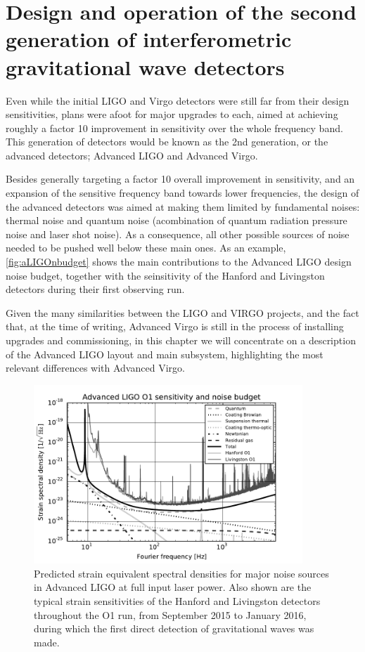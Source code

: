 \section{Design and operation of the second generation of interferometric gravitational wave detectors}\label{subsec:2ndgen}
Even while the initial LIGO and Virgo detectors were still far from their design sensitivities, plans were afoot for major upgrades to each, aimed at achieving roughly a factor 10 improvement in sensitivity over the whole frequency band. 
This generation of detectors would be known as the 2nd generation, or the advanced detectors; Advanced LIGO and Advanced Virgo. 

Besides generally targeting a factor 10 overall improvement in sensitivity, and an expansion of the sensitive frequency band towards lower frequencies, the design of the advanced detectors was aimed at making them limited by fundamental noises: thermal noise and quantum noise (acombination of quantum radiation pressure noise and laser shot noise).
As a consequence, all other possible sources of noise needed to be pushed well below these main ones.
As an example, \autoref{fig:aLIGOnbudget} shows the main contributions to the Advanced LIGO design noise budget, together with the seinsitivity of the Hanford and Livingston detectors during their first observing run.

Given the many similarities between the LIGO and VIRGO projects, and the fact that, at the time of writing, Advanced Virgo is still in the process of installing upgrades and commissioning, in this chapter we will concentrate on a description of the Advanced LIGO layout and main subsystem, highlighting the most relevant differences with Advanced Virgo.

\begin{figure}[htb]
	\begin{center}
		\includegraphics[width=0.9\textwidth]{aLIGOnbudget_gray.pdf}
		\caption{\label{fig:aLIGOnbudget}Predicted strain equivalent spectral densities for major noise sources in Advanced LIGO at full input laser power. Also shown are the typical strain sensitivities of the Hanford and Livingston detectors throughout the O1 run, from September 2015 to January 2016, during which the first direct detection of gravitational waves was made.}
	\end{center}
\end{figure}

